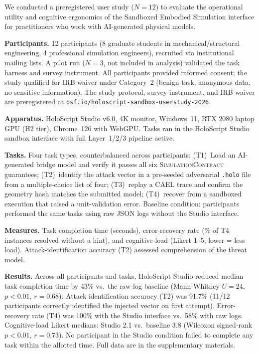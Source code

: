 \documentclass[letterpaper,twocolumn,10pt]{article}
\newcommand{\holoscript}{HoloScript}
\newcommand{\simcontract}{\textsc{SimulationContract}}
\begin{document}
We conducted a preregistered user study ($N=12$) to evaluate the
operational utility and cognitive ergonomics of the Sandboxed Embodied
Simulation interface for practitioners who work with AI-generated
physical models.

\textbf{Participants.}  12 participants (8 graduate students in
mechanical/structural engineering, 4 professional simulation engineers),
recruited via institutional mailing lists.  A pilot run ($N=3$, not
included in analysis) validated the task harness and survey instrument.
All participants provided informed consent; the study qualified for IRB
waiver under Category~2 (benign task, anonymous data, no sensitive
information).  The study protocol, survey instrument, and IRB waiver
are preregistered at \texttt{osf.io/holoscript-sandbox-userstudy-2026}.

\textbf{Apparatus.}  HoloScript Studio v6.0, 4K monitor, Windows~11,
RTX 2080 laptop GPU (H2 tier), Chrome~126 with WebGPU.  Tasks ran in
the HoloScript Studio sandbox interface with full Layer~1/2/3 pipeline
active.

\textbf{Tasks.}  Four task types, counterbalanced across participants:
(T1)~Load an AI-generated bridge model and verify it passes all six
\simcontract{} guarantees; (T2)~identify the attack vector in a pre-seeded
adversarial \texttt{.holo} file from a multiple-choice list of four;
(T3)~replay a CAEL trace and confirm the geometry hash matches the
submitted model; (T4)~recover from a sandboxed execution that raised a
unit-validation error.  Baseline condition: participants performed the
same tasks using raw JSON logs without the Studio interface.

\textbf{Measures.}  Task completion time (seconds), error-recovery
rate (\% of T4 instances resolved without a hint), and cognitive-load
(Likert 1–5, lower = less load).  Attack-identification accuracy (T2)
assessed comprehension of the threat model.

\textbf{Results.}  Across all participants and tasks, \holoscript{}
Studio reduced median task completion time by 43\% vs.\ the raw-log
baseline (Mann-Whitney $U=24$, $p<0.01$, $r=0.68$).  Attack
identification accuracy (T2) was 91.7\% (11/12 participants correctly
identified the injected vector on first attempt).  Error-recovery rate
(T4) was 100\% with the Studio interface vs.\ 58\% with raw logs.
Cognitive-load Likert medians: Studio 2.1 vs.\ baseline 3.8
(Wilcoxon signed-rank $p<0.01$, $r=0.73$).  No participant in the
Studio condition failed to complete any task within the allotted time.
Full data are in the supplementary materials.
\end{document}
